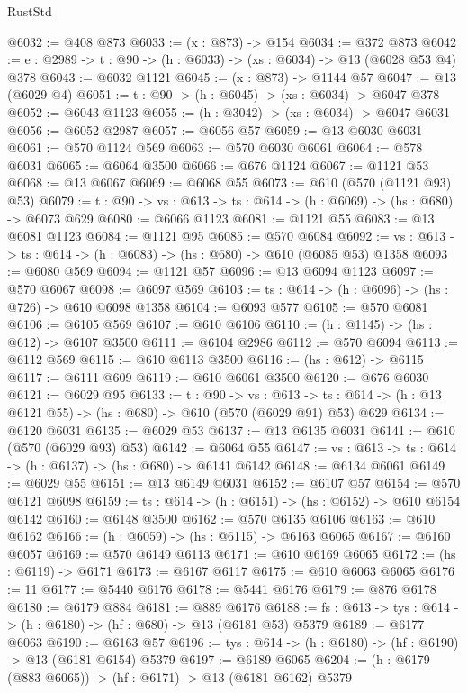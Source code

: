 \begin{lexlean}{RustStd}
\begin{coremodule}
@6032 := @408 @873
@6033 := (x : @873) -> @154
@6034 := @372 @873
@6042 := {e : @2989} -> {t : @90} -> (h : @6033) -> (xs : @6034) -> @13 (@6028 @53 @4) @378
@6043 := @6032 @1121
@6045 := (x : @873) -> @1144 @57
@6047 := @13 (@6029 @4)
@6051 := {t : @90} -> (h : @6045) -> (xs : @6034) -> @6047 @378
@6052 := @6043 @1123
@6055 := (h : @3042) -> (xs : @6034) -> @6047 @6031
@6056 := @6052 @2987
@6057 := @6056 @57
@6059 := @13 @6030 @6031
@6061 := @570 @1124 @569
@6063 := @570 @6030 @6061
@6064 := @578 @6031
@6065 := @6064 @3500
@6066 := @676 @1124
@6067 := @1121 @53
@6068 := @13 @6067
@6069 := @6068 @55
@6073 := @610 (@570 (@1121 @93) @53)
@6079 := {t : @90} -> {vs : @613} -> {ts : @614} -> (h : @6069) -> (hs : @680) -> @6073 @629
@6080 := @6066 @1123
@6081 := @1121 @55
@6083 := @13 @6081 @1123
@6084 := @1121 @95
@6085 := @570 @6084
@6092 := {vs : @613} -> {ts : @614} -> (h : @6083) -> (hs : @680) -> @610 (@6085 @53) @1358
@6093 := @6080 @569
@6094 := @1121 @57
@6096 := @13 @6094 @1123
@6097 := @570 @6067
@6098 := @6097 @569
@6103 := {ts : @614} -> (h : @6096) -> (hs : @726) -> @610 @6098 @1358
@6104 := @6093 @577
@6105 := @570 @6081
@6106 := @6105 @569
@6107 := @610 @6106
@6110 := (h : @1145) -> (hs : @612) -> @6107 @3500
@6111 := @6104 @2986
@6112 := @570 @6094
@6113 := @6112 @569
@6115 := @610 @6113 @3500
@6116 := (hs : @612) -> @6115
@6117 := @6111 @609
@6119 := @610 @6061 @3500
@6120 := @676 @6030
@6121 := @6029 @95
@6133 := {t : @90} ->
  {vs : @613} ->
  {ts : @614} -> (h : @13 @6121 @55) -> (hs : @680) -> @610 (@570 (@6029 @91) @53) @629
@6134 := @6120 @6031
@6135 := @6029 @53
@6137 := @13 @6135 @6031
@6141 := @610 (@570 (@6029 @93) @53)
@6142 := @6064 @55
@6147 := {vs : @613} -> {ts : @614} -> (h : @6137) -> (hs : @680) -> @6141 @6142
@6148 := @6134 @6061
@6149 := @6029 @55
@6151 := @13 @6149 @6031
@6152 := @6107 @57
@6154 := @570 @6121 @6098
@6159 := {ts : @614} -> (h : @6151) -> (hs : @6152) -> @610 @6154 @6142
@6160 := @6148 @3500
@6162 := @570 @6135 @6106
@6163 := @610 @6162
@6166 := (h : @6059) -> (hs : @6115) -> @6163 @6065
@6167 := @6160 @6057
@6169 := @570 @6149 @6113
@6171 := @610 @6169 @6065
@6172 := (hs : @6119) -> @6171
@6173 := @6167 @6117
@6175 := @610 @6063 @6065
@6176 := 11
@6177 := @5440 @6176
@6178 := @5441 @6176
@6179 := @876 @6178
@6180 := @6179 @884
@6181 := @889 @6176
@6188 := {fs : @613} -> {tys : @614} -> (h : @6180) -> (hf : @680) -> @13 (@6181 @53) @5379
@6189 := @6177 @6063
@6190 := @6163 @57
@6196 := {tys : @614} -> (h : @6180) -> (hf : @6190) -> @13 (@6181 @6154) @5379
@6197 := @6189 @6065
@6204 := (h : @6179 (@883 @6065)) -> (hf : @6171) -> @13 (@6181 @6162) @5379

\end{coremodule}
\end{lexlean}
